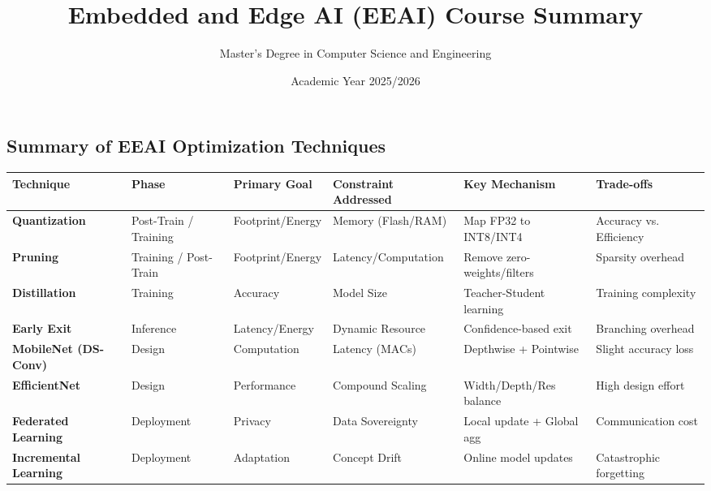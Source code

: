 \documentclass[11pt]{article}
\title{\textbf{Embedded and Edge AI (EEAI) Course Summary}}
\author{Master's Degree in Computer Science and Engineering}
\date{Academic Year 2025/2026}
\begin{document}
\maketitle

\tableofcontents
\newpage


\newpage

\newpage

\newpage

\newpage

\newpage

\newpage

\newpage

\newpage


\newpage
\begin{landscape}
\section{Summary of EEAI Optimization Techniques}

\begin{center}
\small
\renewcommand{\arraystretch}{1.5}
\begin{longtable}{>{\bfseries}p{3cm} p{2cm} p{2cm} p{3cm} p{4cm} p{4cm}}
\toprule
Technique & Phase & Primary Goal & Constraint Addressed & Key Mechanism & Trade-offs \\ \midrule
Quantization & Post-Train / Training & Footprint/Energy & Memory (Flash/RAM) & Map FP32 to INT8/INT4 & Accuracy vs. Efficiency \\
Pruning & Training / Post-Train & Footprint/Energy & Latency/Computation & Remove zero-weights/filters & Sparsity overhead \\
Distillation & Training & Accuracy & Model Size & Teacher-Student learning & Training complexity \\
Early Exit & Inference & Latency/Energy & Dynamic Resource & Confidence-based exit & Branching overhead \\
MobileNet (DS-Conv) & Design & Computation & Latency (MACs) & Depthwise + Pointwise & Slight accuracy loss \\
EfficientNet & Design & Performance & Compound Scaling & Width/Depth/Res balance & High design effort \\
Federated Learning & Deployment & Privacy & Data Sovereignty & Local update + Global agg & Communication cost \\
Incremental Learning & Deployment & Adaptation & Concept Drift & Online model updates & Catastrophic forgetting \\ \bottomrule
\end{longtable}
\end{center}
\end{landscape}
\end{document}
